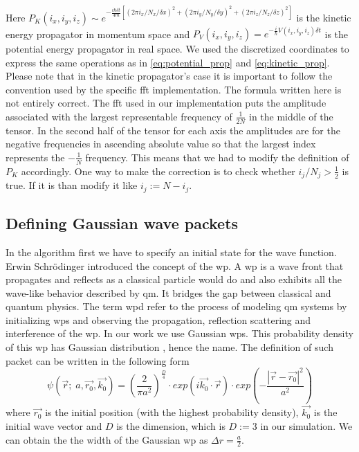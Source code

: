Here $P_K(i_x, i_y, i_z) \sim e^{-\frac{i \hbar \delta t}{4m} \left[(2\pi i_x / N_x / \delta x)^2 + (2\pi i_y / N_y /\delta y)^2 + (2\pi i_z / N_z / \delta z)^2\right]}$ is the kinetic energy propagator in momentum space and $P_V(i_x, i_y, i_z) = e^{-\frac{i}{\hbar}V(i_x, i_y, i_z)\delta t}$ is the potential energy propagator in real space.
We used the discretized coordinates to express the same operations as in \ref{eq:potential_prop} and \ref{eq:kinetic_prop}.
Please note that in the kinetic propagator's case it is important to follow the convention used by the specific \acrshort{fft} implementation.
The formula written here is not entirely correct.
The \acrshort{fft} used in our implementation puts the amplitude associated with the largest representable frequency of $\frac{1}{2N}$ in the middle of the tensor.
In the second half of the tensor for each axis the amplitudes are for the negative frequencies in ascending absolute value so that the largest index represents the $-\frac{1}{N}$ frequency.
This means that we had to modify the definition of $P_K$ accordingly.
One way to make the correction is to check whether $i_j / N_j > \frac{1}{2}$ is true. If it is than modify it like $i_j := N - i_j$.

\subsection{Defining Gaussian wave packets}

In the algorithm first we have to specify an initial state for the wave function.
Erwin Schrödinger introduced the concept of the \acrfull{wp}.
A \acrshort{wp} is a wave front that propagates and reflects as a classical particle would do
and also exhibits all the wave-like behavior described by \acrshort{qm}.
It bridges the gap between classical and quantum physics.
The term \acrfull{wpd} refer to the process of modeling \acrshort{qm} systems by initializing \acrshort{wp}s
and observing the propagation, reflection scattering and interference of the \acrshort{wp}.
In our work we use Gaussian \acrshort{wp}s.
This probability density of this \acrshort{wp} has Gaussian distribution \cite{Zhang2010}, hence the name.
The definition of such packet can be written in the following form
\begin{equation}
	\label{eq:gaussiaon_wp}
	\psi(\vec{r};\; a, \vec{r_0}, \vec{k_0}) = \left( \frac{2}{\pi a^2} \right)^{\frac{D}{4}} \cdot exp\left( i\vec{k_0} \cdot \vec{r} \right) \cdot exp \left( -\frac{|\vec{r} - \vec{r_0}|^2}{a^2} \right)
\end{equation}
where $\vec{r_0}$ is the initial position (with the highest probability density), $\vec{k_0}$ is the initial wave vector and $D$ is the dimension, which is  $D:=3$ in our simulation.
We can obtain the the width of the Gaussian \acrshort{wp} as $\Delta r = \frac{a}{2}$.

